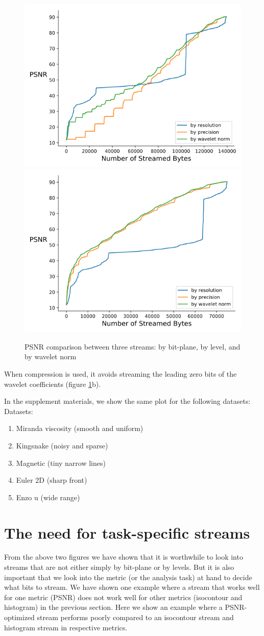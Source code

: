 \begin{figure}[t]
	\centering
	{\includegraphics[width=0.4\linewidth]{resources/rmse-miranda-viscosity.png}}
	{\includegraphics[width=0.4\linewidth]{resources/rmse-miranda-viscosity_slz.png}}
	\caption {PSNR comparison between three streams: by bit-plane, by level, and by wavelet norm}
	\label{fig:psnr_traditional_vs_by_norm_viscosity}
\end{figure}

When compression is used, it avoids streaming the leading zero bits of the wavelet coefficients (figure \ref{fig:psnr_traditional_vs_by_norm_viscosity}b).

In the supplement materials, we show the same plot for the following datasets:
Datasets:
\begin{enumerate}
  \item Miranda viscosity (smooth and uniform)
  \item Kingsnake (noisy and sparse)
  \item Magnetic (tiny narrow lines)
  \item Euler 2D (sharp front)
  \item Enzo u (wide range)
\end{enumerate}

\section{The need for task-specific streams}
From the above two figures we have shown that it is worthwhile to look into streams that are not either simply by bit-plane or by levels. But it is also important that we look into the metric (or the analysis task) at hand to decide what bits to stream. We have shown one example where a stream that works well for one metric (PSNR) does not work well for other metrics (isocontour and histogram) in the previous section. Here we show an example where a PSNR-optimized stream performs poorly compared to an isocontour stream and histogram stream in respective metrics.

